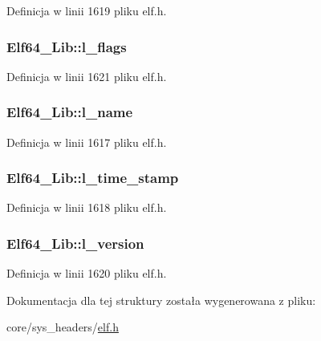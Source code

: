 Definicja w linii 1619 pliku elf.\-h.

\hypertarget{struct_elf64___lib_ac78fa7eafc377b04fcaf575c61dc2b60}{
\subsubsection[{l\-\_\-flags}]{ Elf64\-\_\-\-Lib\-::l\-\_\-flags}}\label{struct_elf64___lib_ac78fa7eafc377b04fcaf575c61dc2b60}


Definicja w linii 1621 pliku elf.\-h.

\hypertarget{struct_elf64___lib_ac7f21d23c86f56c6583aa563eb960af0}{
\subsubsection[{l\-\_\-name}]{ Elf64\-\_\-\-Lib\-::l\-\_\-name}}\label{struct_elf64___lib_ac7f21d23c86f56c6583aa563eb960af0}


Definicja w linii 1617 pliku elf.\-h.

\hypertarget{struct_elf64___lib_ace001f85c3f31e91fedf4a1a1f923af5}{
\subsubsection[{l\-\_\-time\-\_\-stamp}]{ Elf64\-\_\-\-Lib\-::l\-\_\-time\-\_\-stamp}}\label{struct_elf64___lib_ace001f85c3f31e91fedf4a1a1f923af5}


Definicja w linii 1618 pliku elf.\-h.

\hypertarget{struct_elf64___lib_ab03d7034a6f1113717a9eefe33cb8343}{
\subsubsection[{l\-\_\-version}]{ Elf64\-\_\-\-Lib\-::l\-\_\-version}}\label{struct_elf64___lib_ab03d7034a6f1113717a9eefe33cb8343}


Definicja w linii 1620 pliku elf.\-h.



Dokumentacja dla tej struktury została wygenerowana z pliku\-:\begin{DoxyCompactItemize}
\item 
core/sys\-\_\-headers/\hyperlink{elf_8h}{elf.\-h}\end{DoxyCompactItemize}
